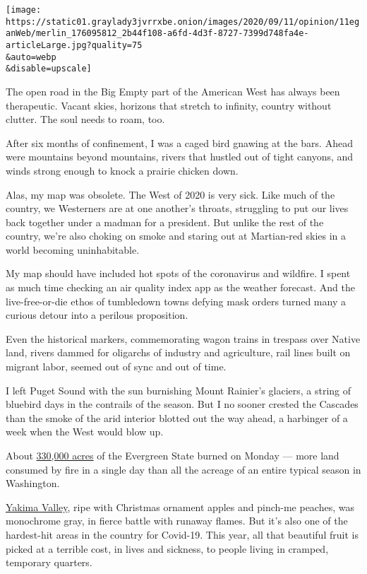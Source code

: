 \texttt{[image: https://static01.graylady3jvrrxbe.onion/images/2020/09/11/opinion/11eganWeb/merlin\_176095812\_2b44f108-a6fd-4d3f-8727-7399d748fa4e-articleLarge.jpg?quality=75\\\&auto=webp\\\&disable=upscale]}

The open road in the Big Empty part of the American West has always been
therapeutic. Vacant skies, horizons that stretch to infinity, country
without clutter. The soul needs to roam, too.

After six months of confinement, I was a caged bird gnawing at the bars.
Ahead were mountains beyond mountains, rivers that hustled out of tight
canyons, and winds strong enough to knock a prairie chicken down.

Alas, my map was obsolete. The West of 2020 is very sick. Like much of
the country, we Westerners are at one another's throats, struggling to
put our lives back together under a madman for a president. But unlike
the rest of the country, we're also choking on smoke and staring out at
Martian-red skies in a world becoming uninhabitable.

My map should have included hot spots of the coronavirus and wildfire. I
spent as much time checking an air quality index app as the weather
forecast. And the live-free-or-die ethos of tumbledown towns defying
mask orders turned many a curious detour into a perilous proposition.

Even the historical markers, commemorating wagon trains in trespass over
Native land, rivers dammed for oligarchs of industry and agriculture,
rail lines built on migrant labor, seemed out of sync and out of time.

I left Puget Sound with the sun burnishing Mount Rainier's glaciers, a
string of bluebird days in the contrails of the season. But I no sooner
crested the Cascades than the smoke of the arid interior blotted out the
way ahead, a harbinger of a week when the West would blow up.

About
\href{https://twitter.com/GovInslee/status/1303459243853451264}{330,000
acres} of the Evergreen State burned on Monday --- more land consumed by
fire in a single day than all the acreage of an entire typical season in
Washington.

\href{https://www.opb.org/news/article/yakima-county-covid-19-hot-agriculture/}{Yakima
Valley}, ripe with Christmas ornament apples and pinch-me peaches, was
monochrome gray, in fierce battle with runaway flames. But it's also one
of the hardest-hit areas in the country for Covid-19. This year, all
that beautiful fruit is picked at a terrible cost, in lives and
sickness, to people living in cramped, temporary quarters.

